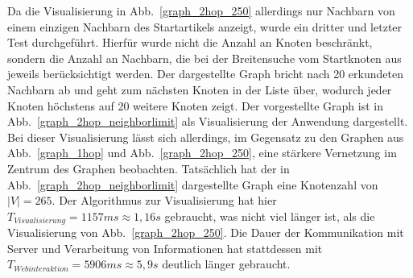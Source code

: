 \documentclass[12pt, a4paper]{article}
\begin{document}
Da die Visualisierung in Abb.~\ref{graph_2hop_250} allerdings nur Nachbarn von einem einzigen Nachbarn des Startartikels anzeigt, wurde ein dritter und letzter Test durchgeführt. Hierfür wurde nicht die Anzahl an Knoten beschränkt, sondern die Anzahl an Nachbarn, die bei der Breitensuche vom Startknoten aus jeweils berücksichtigt werden. Der dargestellte Graph bricht nach 20 erkundeten Nachbarn ab und geht zum nächsten Knoten in der Liste über, wodurch jeder Knoten höchstens auf 20 weitere Knoten zeigt. Der vorgestellte Graph ist in Abb.~\ref{graph_2hop_neighborlimit} als Visualisierung der Anwendung dargestellt. Bei dieser Visualisierung lässt sich allerdings, im Gegensatz zu den Graphen aus Abb.~\ref{graph_1hop} und Abb.~\ref{graph_2hop_250}, eine stärkere Vernetzung im Zentrum des Graphen beobachten. Tatsächlich hat der in Abb.~\ref{graph_2hop_neighborlimit} dargestellte Graph eine Knotenzahl von $|V|=265$. Der Algorithmus zur Visualisierung hat hier $T_{Visualisierung}=1157 ms \approx 1,16 s$ gebraucht, was nicht viel länger ist, als die Visualisierung von Abb.~\ref{graph_2hop_250}. Die Dauer der Kommunikation mit Server und Verarbeitung von Informationen hat stattdessen mit $T_{Webinteraktion}=5906 ms \approx 5,9 s$ deutlich länger gebraucht.\\
\end{document}

